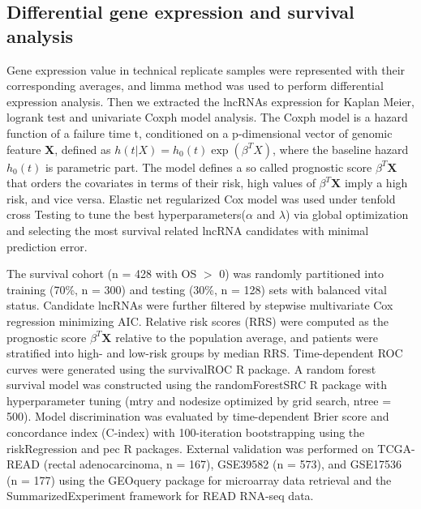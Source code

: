 \documentclass[fleqn,10pt]{wlscirep}
\begin{document}
\subsection*{Differential gene expression and survival analysis}
Gene expression value in technical replicate samples were represented with their corresponding averages, and limma method  was used to perform differential expression analysis\cite{RN27}. Then we extracted the lncRNAs expression for Kaplan Meier, logrank test and univariate Coxph model analysis. The Coxph model is a hazard function of a failure time t, conditioned on a p-dimensional vector of genomic feature \textbf X, defined as $h(t | X)=h_{0}(t) \exp \left(\beta^{T} X\right)$, where the baseline hazard $h_{0}(t)$ is parametric part. The model defines a so called prognostic score $\beta^{T}\mathbf X$ that orders the covariates in terms of their risk, high values of $\beta^{T}\mathbf X$ imply a high risk, and vice versa.
Elastic net regularized Cox model was used under tenfold cross Testing to tune the best hyperparameters($\alpha$ and $\lambda$) via global optimization \cite{RN28,RN29} and selecting the most survival related lncRNA candidates with minimal prediction error.

The survival cohort (n = 428 with OS $>$ 0) was randomly partitioned into training (70\%, n = 300) and testing (30\%, n = 128) sets with balanced vital status. Candidate lncRNAs were further filtered by stepwise multivariate Cox regression minimizing AIC. Relative risk scores (RRS) were computed as the prognostic score $\beta^{T}\mathbf{X}$ relative to the population average, and patients were stratified into high- and low-risk groups by median RRS. Time-dependent ROC curves were generated using the survivalROC R package\cite{RN31}. A random forest survival model was constructed using the randomForestSRC R package with hyperparameter tuning (mtry and nodesize optimized by grid search, ntree = 500)\cite{RN32}. Model discrimination was evaluated by time-dependent Brier score and concordance index (C-index) with 100-iteration bootstrapping using the riskRegression and pec R packages\cite{RN33}. External validation was performed on TCGA-READ (rectal adenocarcinoma, n = 167), GSE39582 (n = 573), and GSE17536 (n = 177) using the GEOquery package for microarray data retrieval and the SummarizedExperiment framework for READ RNA-seq data.
\end{document}
